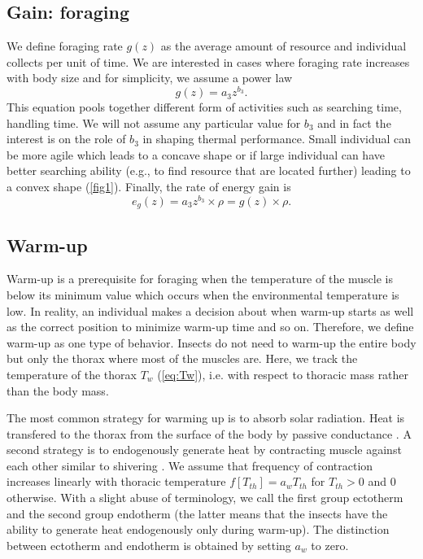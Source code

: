 \subsection*{Gain: foraging}
We define foraging rate $g(z)$ as the average amount of resource and individual collects per unit of time.
We are interested in cases where foraging rate increases with body size and for simplicity, we assume a power law 
\[
	g(z) = a_3 z^{b_3}.
\]
This equation pools together different form of activities such as searching time, handling time.
We will not assume any particular value for $b_3$ and in fact the interest is on the role of $b_3$ in shaping thermal performance.
Small individual can be more agile which leads to a concave shape or if large individual can have better searching ability (e.g., to find resource that are located further) leading to a convex shape (\cref{fig1}). 
Finally, the rate of energy gain is  
\begin{equation} \label{eq:eg}
	e_g(z) = a_3 z^{b_3} \times \rho  = g(z) \times \rho.
\end{equation}

\subsection*{Warm-up}
Warm-up is a prerequisite for foraging when the temperature of the muscle is below its minimum value which occurs when the environmental temperature is low. 
In reality, an individual makes a decision about when warm-up starts as well as the correct position to minimize warm-up time and so on. 
Therefore, we define warm-up as one type of behavior.
Insects do not need to warm-up the entire body but only the thorax where most of the muscles are. 
Here, we track the temperature of the thorax $T_w$ (\cref{eq:Tw}), i.e. with respect to thoracic mass rather than the body mass.

The most common strategy for warming up is to absorb solar radiation.
Heat is transfered to the thorax from the surface of the body by passive conductance \citep{Bakken1976}.
A second strategy is to endogenously generate heat by contracting muscle against each other similar to shivering \citep[e.g.,][]{Kammer1974}.
We assume that frequency of contraction increases linearly with thoracic temperature $f[T_{th}]  = a_w T_{th}$ for $T_{th}> 0$ and 0 otherwise.
With a slight abuse of terminology, we call the first group  ectotherm and the second group endotherm (the latter means that the insects have the ability to generate heat endogenously only during warm-up).
The distinction between ectotherm and endotherm is obtained by setting $a_w$ to zero.

